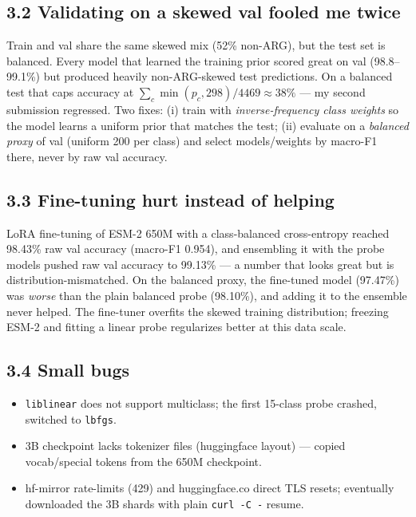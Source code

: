 \documentclass[11pt,a4paper]{article}
\begin{document}
\subsection*{3.2 Validating on a skewed val fooled me twice}

Train and val share the same skewed mix (52\% non-ARG), but the test set
is balanced. Every model that learned the training prior scored great on
val (98.8--99.1\%) but produced heavily non-ARG-skewed test predictions.
On a balanced test that caps accuracy at
$\sum_c \min(p_c, 298)/4469 \approx 38\%$ --- my second submission
regressed. Two fixes: (i) train with \emph{inverse-frequency class
weights} so the model learns a uniform prior that matches the test;
(ii) evaluate on a \emph{balanced proxy} of val (uniform 200 per class)
and select models/weights by macro-F1 there, never by raw val accuracy.

\subsection*{3.3 Fine-tuning hurt instead of helping}

LoRA fine-tuning of ESM-2 650M with a class-balanced cross-entropy
reached 98.43\% raw val accuracy (macro-F1 0.954), and ensembling it
with the probe models pushed raw val accuracy to 99.13\% --- a number
that looks great but is distribution-mismatched. On the balanced proxy,
the fine-tuned model (97.47\%) was \emph{worse} than the plain balanced
probe (98.10\%), and adding it to the ensemble never helped. The
fine-tuner overfits the skewed training distribution; freezing ESM-2 and
fitting a linear probe regularizes better at this data scale.

\subsection*{3.4 Small bugs}

\begin{itemize}
\item \texttt{liblinear} does not support multiclass; the first 15-class
probe crashed, switched to \texttt{lbfgs}.
\item 3B checkpoint lacks tokenizer files (huggingface layout) ---
copied vocab/special tokens from the 650M checkpoint.
\item hf-mirror rate-limits (429) and huggingface.co direct TLS resets;
eventually downloaded the 3B shards with plain \texttt{curl -C -}
resume.
\end{itemize}
\end{document}
